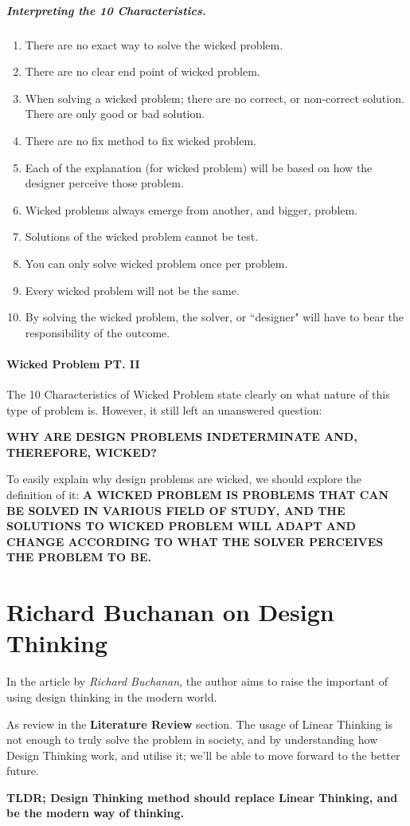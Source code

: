 \documentclass[11pt, twocolumn]{article}
\begin{document}
			\subsubsection{Interpreting the 10 Characteristics.}
				\begin{enumerate}
					\item There are no exact way to solve the wicked problem.
					\item There are no clear end point of wicked problem.
					\item When solving a wicked problem; there are no correct, or non-correct solution. There are only good or bad solution.
					\item There are no fix method to fix wicked problem.
					\item Each of the explanation (for wicked problem) will be based on how the designer perceive those problem.
					\item Wicked problems always emerge from another, and bigger, problem.
					\item Solutions of the wicked problem cannot be test.
					\item You can only solve wicked problem once per problem.
					\item Every wicked problem will not be the same.
					\item By solving the wicked problem, the solver, or ``designer" will have to bear the responsibility of the outcome.
				\end{enumerate}
				
		\subsection{Wicked Problem PT. II}
		
			The 10 Characteristics of Wicked Problem state clearly on what nature of this type of problem is. However, it still left an unanswered question:
			\begin{center}
				 \textbf{WHY ARE DESIGN PROBLEMS INDETERMINATE AND, THEREFORE, WICKED?}
			\end{center}
			To easily explain why design problems are wicked, we should explore the definition of it:
			\textbf{A WICKED PROBLEM IS PROBLEMS THAT CAN BE SOLVED IN VARIOUS FIELD OF STUDY, AND THE SOLUTIONS TO WICKED PROBLEM WILL ADAPT AND CHANGE ACCORDING TO WHAT THE SOLVER PERCEIVES THE PROBLEM TO BE.}
\part{Richard Buchanan on Design Thinking}
	In the article by \textit{Richard Buchanan}, the author aims to raise the important of using design thinking in the modern world.
	
	As review in the \textbf{Literature Review} section. The usage of Linear Thinking is not enough to truly solve the problem in society, and by understanding how Design Thinking work, and utilise it; we'll be able to move forward to the better future.
	
	\textbf{TLDR; Design Thinking method should replace Linear Thinking, and be the modern way of thinking.}
	
\end{document}
